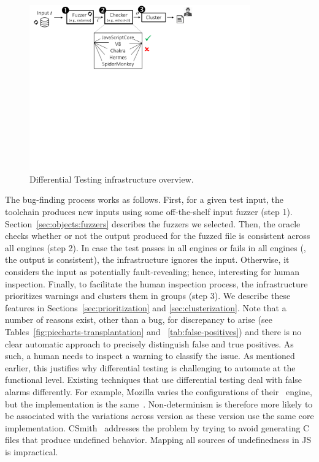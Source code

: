 \documentclass[smallextended]{svjour3}
\begin{document}
\begin{figure}[t]
  \centering
  \includegraphics[trim=0 330 170 0,clip,width=0.85\textwidth]{diff-testing-runtimes}
  \caption{\label{fig:workflow}Differential Testing infrastructure
    overview.}
\end{figure}

The bug-finding process works as follows. First, for a given test
input, the toolchain produces new inputs using some off-the-shelf
input fuzzer (step 1). Section~\ref{sec:objects:fuzzers} describes the
fuzzers we selected. Then, the oracle checks whether or not the output
produced for the fuzzed file is consistent across all engines (step
2). In case the test passes in all engines or fails in all engines
(\ie{}, the output is consistent), the infrastructure ignores the
input. Otherwise, it considers the input as potentially
fault-revealing; hence, interesting for human inspection. Finally, to
facilitate the human inspection process, the infrastructure
prioritizes warnings and clusters them in groups (step 3). We describe
these features in Sections~\ref{sec:prioritization} and
\ref{sec:clusterization}. Note that a number of reasons exist, other
than a bug, for discrepancy to arise (see
Tables~\ref{fig:piecharts-transplantation} and
~\ref{tab:false-positives}) and there is no clear automatic approach
to precisely distinguish false and true positives. As such, a human
needs to inspect a warning to classify the issue. As mentioned
earlier, this justifies why differential testing is challenging to
automate at the functional level. Existing techniques that use
differential testing deal with false alarms differently. For example,
Mozilla varies the configurations of their \smonkey\ engine, but the
implementation is the same~\cite{mozilla-severity}. Non-determinism is
therefore more likely to be associated with the variations across
version as these version use the same core
implementation. CSmith~\cite{Yang:2011:FUB:1993498.1993532} addresses
the problem by trying to avoid generating C files that produce
undefined behavior. Mapping all sources of undefinedness in JS is
impractical.
\end{document}
